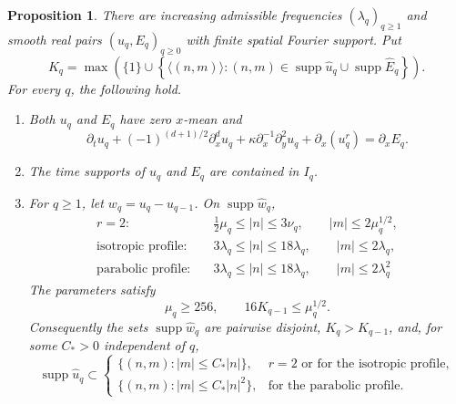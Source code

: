 \documentclass[12pt,reqno,letterpaper]{amsart}
\numberwithin{equation}{section}
\newtheorem{proposition}[theorem]{Proposition}
\theoremstyle{definition}
\newcommand{\la}{\lambda}
\newcommand{\supp}{\operatorname{supp}}
\newcommand{\abs}[1]{\left\lvert #1\right\rvert}
\begin{document}
\begin{proposition}\label{prop:inductive}
There are increasing admissible frequencies $(\la_q)_{q\geq1}$ and smooth real pairs
$(u_q,E_q)_{q\geq0}$ with finite spatial Fourier support.  Put
\[
 K_q=\max\left(\{1\}\cup
 \left\{\langle(n,m)\rangle:
 (n,m)\in\supp\widehat u_q\cup\supp\widehat E_q\right\}\right).
\]
For every $q$, the following hold.
\begin{enumerate}[label=\textup{(\roman*)}]
 \item Both $u_q$ and $E_q$ have zero $x$-mean and
 \begin{equation}\label{eq:periodic-induction-indexed-relaxed}
  \partial_tu_q+(-1)^{(d+1)/2}\partial_x^du_q
  +\kappa\partial_x^{-1}\partial_y^2u_q+\partial_x(u_q^r)
  =\partial_xE_q.
 \end{equation}

 \item The time supports of $u_q$ and $E_q$ are contained in $I_q$.

 \item For $q\geq1$, let $w_q=u_q-u_{q-1}$.  On
 $\supp\widehat w_q$,
 \begin{equation*}
 \begin{aligned}
  r=2:&\quad \frac12\mu_q\leq\abs n\leq3\nu_q,
       \qquad \abs m\leq2\mu_q^{1/2},\\
  \text{isotropic profile}:&\quad
       3\la_q\leq\abs n\leq18\la_q,
       \qquad \abs m\leq2\la_q,\\
  \text{parabolic profile}:&\quad
       3\la_q\leq\abs n\leq18\la_q,
       \qquad \abs m\leq2\la_q^2
 \end{aligned}
 \end{equation*}
 The parameters satisfy
 \begin{equation*}
  \mu_q\geq256,\qquad16K_{q-1}\leq\mu_q^{1/2}.
 \end{equation*}
 Consequently the sets $\supp\widehat w_q$ are pairwise disjoint,
 $K_q>K_{q-1}$, and, for some $C_*>0$ independent of $q$,
 \begin{equation}\label{eq:periodic-induction-support}
  \supp\widehat u_q\subset
  \begin{cases}
   \{(n,m):\abs m\leq C_*\abs n\},
      &r=2\text{ or for the isotropic profile},\\
   \{(n,m):\abs m\leq C_*\abs n^2\},
      &\text{for the parabolic profile}.
  \end{cases}
 \end{equation}


\end{enumerate}
\end{proposition}
\end{document}
